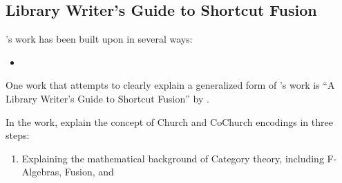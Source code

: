 
\subsection{Library Writer's Guide to Shortcut Fusion}
\cite{Gill1993}'s work has been built upon in several ways:

\begin{itemize}
    \item 
\end{itemize}




One work that attempts to clearly explain a generalized form of \cite{Gill1993}'s work is ``A Library Writer's Guide to Shortcut Fusion'' by \cite{Harper2011}.


In the work, \cite{Harper2011} explain the concept of Church and CoChurch encodings in three steps:
\begin{enumerate}
    \item Explaining the mathematical background of Category theory, including F-Algebras, Fusion, and 
\end{enumerate}


